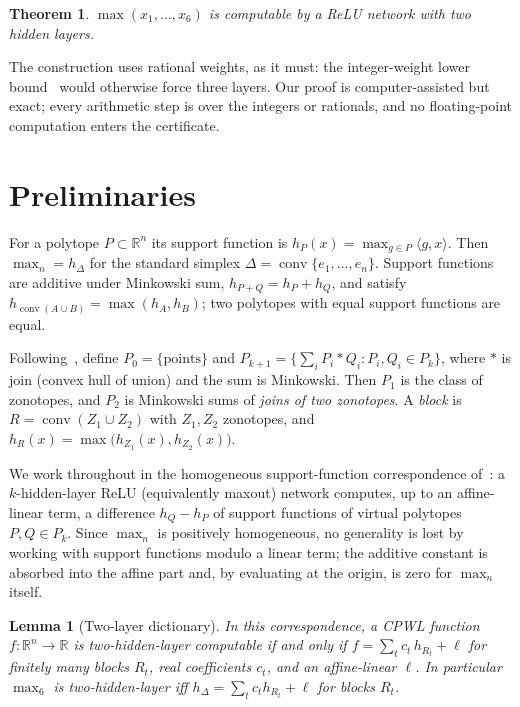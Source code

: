 \documentclass[11pt]{article}
\newtheorem{theorem}{Theorem}
\newtheorem{lemma}{Lemma}
\theoremstyle{definition}
\newcommand{\RR}{\mathbb{R}}
\DeclareMathOperator{\conv}{conv}
\begin{document}
\begin{theorem}\label{thm:main}
$\max(x_1,\dots,x_6)$ is computable by a ReLU network with two hidden layers.
\end{theorem}

The construction uses rational weights, as it must: the integer-weight lower bound~\cite{HHL} would
otherwise force three layers. Our proof is computer-assisted but exact; every arithmetic step is over the
integers or rationals, and no floating-point computation enters the certificate.

\section{Preliminaries}

For a polytope $P\subset\RR^n$ its support function is $h_P(x)=\max_{g\in P}\langle g,x\rangle$. Then
$\max_n=h_\Delta$ for the standard simplex $\Delta=\conv\{e_1,\dots,e_n\}$. Support functions are additive
under Minkowski sum, $h_{P+Q}=h_P+h_Q$, and satisfy $h_{\conv(A\cup B)}=\max(h_A,h_B)$; two polytopes with
equal support functions are equal.

Following~\cite{BBHSY}, define $P_0=\{\text{points}\}$ and
$P_{k+1}=\{\sum_i P_i * Q_i : P_i,Q_i\in P_k\}$, where $*$ is join (convex hull of union) and the sum is
Minkowski. Then $P_1$ is the class of zonotopes, and $P_2$ is Minkowski sums of \emph{joins of two
zonotopes}. A \emph{block} is $R=\conv(Z_1\cup Z_2)$ with $Z_1,Z_2$ zonotopes, and
$h_R(x)=\max\big(h_{Z_1}(x),h_{Z_2}(x)\big)$.

We work throughout in the homogeneous support-function correspondence of~\cite{BBHSY,HHL}: a $k$-hidden-layer
ReLU (equivalently maxout) network computes, up to an affine-linear term, a difference $h_Q-h_P$ of support
functions of virtual polytopes $P,Q\in P_k$. Since $\max_n$ is positively homogeneous, no generality is lost
by working with support functions modulo a linear term; the additive constant is absorbed into the affine
part and, by evaluating at the origin, is zero for $\max_n$ itself.

\begin{lemma}[Two-layer dictionary]\label{lem:dict}
In this correspondence, a CPWL function $f:\RR^n\to\RR$ is two-hidden-layer computable if and only if
$f=\sum_{t} c_t\,h_{R_t}+\ell$ for finitely many blocks $R_t$, real coefficients $c_t$, and an affine-linear
$\ell$. In particular $\max_6$ is two-hidden-layer iff $h_\Delta=\sum_t c_t h_{R_t}+\ell$ for blocks $R_t$.
\end{lemma}
\end{document}
